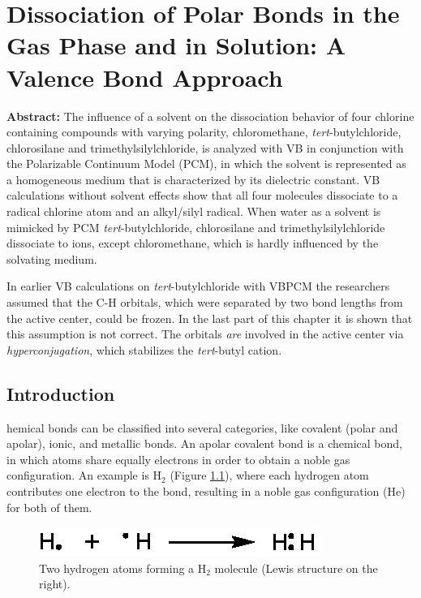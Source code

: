 \chapter{Dissociation of Polar Bonds in the Gas Phase and in Solution: A Valence Bond Approach}
\label{chap_dissociation}



\noindent\textbf{Abstract:} The influence of a solvent on the dissociation behavior of four chlorine containing compounds with varying polarity, chloromethane, \textit{tert}-butylchloride, chlorosilane and trimethylsilylchloride, is analyzed with VB in conjunction with the Polarizable Continuum Model (PCM), in which the solvent is represented as a homogeneous medium that is characterized by its dielectric constant. VB calculations without solvent effects show that all four molecules dissociate to a radical chlorine atom and an alkyl/silyl radical. When water as a solvent is mimicked by PCM \textit{tert}-butylchloride, chlorosilane and trimethylsilylchloride dissociate to ions, except chloromethane, which is hardly influenced by the solvating medium.

In earlier VB calculations on  \textit{tert}-butylchloride with VBPCM the researchers assumed that the C-H orbitals, which were separated by two bond lengths from the active center, could be frozen. In the last part of this chapter it is shown that this assumption is not correct. The orbitals \textit{are} involved in the active center via \textit{hyperconjugation}, which stabilizes the \textit{tert}-butyl cation. 

\clearpage

\section{Introduction}

\lettrine{}{}hemical bonds can be classified into several categories, like covalent (polar and apolar), ionic, and metallic bonds. An apolar covalent bond is a chemical bond, in which atoms share equally electrons in order to obtain a noble gas configuration. An example is H$_2$ (Figure \ref{ch3.fig.h_twee}), where each hydrogen atom contributes one electron to the bond, resulting in a noble gas configuration (He) for both of them.
\begin{figure}[ht]
\center
\includegraphics{dissociation/figures/h_twee.eps}
\caption{Two hydrogen atoms forming a H$_2$ molecule (Lewis structure on the right).}
\label{ch3.fig.h_twee} 
\end{figure}

